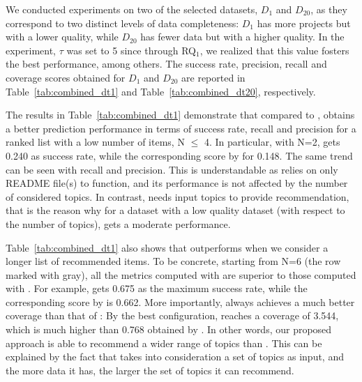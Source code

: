 We conducted experiments on two of the selected datasets, \ie $D_{1}$ and $D_{20}$, as they correspond to two distinct levels of data completeness: $D_{1}$ has more projects but with a lower quality, while $D_{20}$ has fewer data but with a higher quality. In the experiment, $\tau$ was set to 5 since through RQ$_1$, we realized that this value fosters the best performance, among others. %
The success rate, precision, recall and coverage scores obtained for $D_{1}$ and $D_{20}$ are reported in Table~\ref{tab:combined_dt1} and Table~\ref{tab:combined_dt20}, respectively. 

The results in Table~\ref{tab:combined_dt1} demonstrate that compared to \TF, \MNB obtains a better prediction performance in terms of success rate, recall and precision for a ranked list with a low number of items, \ie N $\leq$ 4. In particular, with N=2, \MNB gets 0.240 as success rate, while the corresponding score by \TF for 0.148. The same trend can be seen with recall and precision. This is understandable as \MNB relies on only README file(s) to function, and its performance is not affected by the number of considered topics. In contrast, \TF needs input topics to provide recommendation, that is the reason why for a dataset with a low quality dataset (with respect to the number of topics), \TF gets a moderate performance. %

Table~\ref{tab:combined_dt1} also shows that \TF outperforms \MNB when we consider a longer list of recommended items. To be concrete, starting from N=6 (\ie the row marked with gray), all the metrics computed with \TF are superior to those computed with \MNB. For example, \TF gets 0.675 as the maximum success rate, while the corresponding score by \MNB is 0.662. More importantly, \TF always achieves a much better coverage than that of \MNB: By the best configuration, \TF reaches a coverage of 3.544, which is much higher than 0.768 obtained by \MNB. In other words, our proposed approach is able to recommend a wider range of topics than \MNB. This can be explained by the fact that \TF takes into consideration a set of topics as input, and the more data it has, the larger the set of topics it can recommend.

